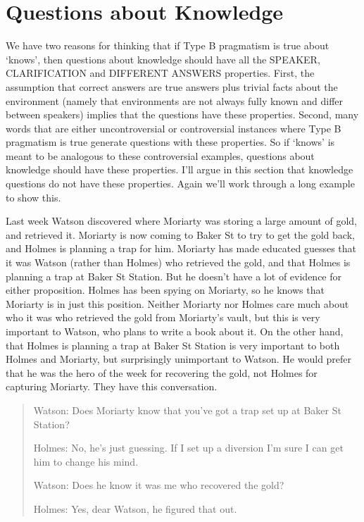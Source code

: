 \section{Questions about Knowledge}

We have two reasons for thinking that if Type B pragmatism is true about `knows', then questions about knowledge should have all the SPEAKER, CLARIFICATION and DIFFERENT ANSWERS properties. First, the assumption that correct answers are true answers plus trivial facts about the environment (namely that environments are not always fully known and differ between speakers) implies that the questions have these properties. Second, many words that are either uncontroversial or controversial instances where Type B pragmatism is true generate questions with these properties. So if `knows' is meant to be analogous to these controversial examples, questions about knowledge should have these properties. I'll argue in this section that knowledge questions do not have these properties. Again we'll work through a long example to show this.

Last week Watson discovered where Moriarty was storing a large amount of gold, and retrieved it. Moriarty is now coming to Baker St to try to get the gold back, and Holmes is planning a trap for him. Moriarty has made educated guesses that it was Watson (rather than Holmes) who retrieved the gold, and that Holmes is planning a trap at Baker St Station. But he doesn't have a lot of evidence for either proposition. Holmes has been spying on Moriarty, so he knows that Moriarty is in just this position. Neither Moriarty nor Holmes care much about who it was who retrieved the gold from Moriarty's vault, but this is very important to Watson, who plans to write a book about it. On the other hand, that Holmes is planning a trap at Baker St Station is very important to both Holmes and Moriarty, but surprisingly unimportant to Watson. He would prefer that he was the hero of the week for recovering the gold, not Holmes for capturing Moriarty. They have this conversation.

\begin{quote}
Watson: Does Moriarty know that you've got a trap set up at Baker St Station?

Holmes: No, he's just guessing. If I set up a diversion I'm sure I can get him to change his mind.

Watson: Does he know it was me who recovered the gold?

Holmes: Yes, dear Watson, he figured that out.
\end{quote}

